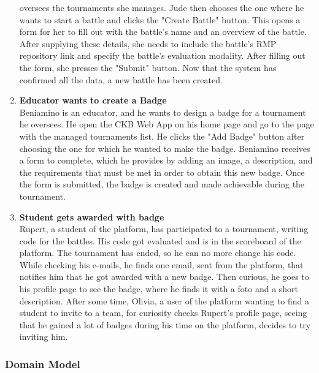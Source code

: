 \begin{enumerate}[label= \textbf{SC\arabic*}]
    oversees the tournaments she manages. Jude then chooses the one where he wants to start a battle and clicks the "Create Battle" button. This opens a form for her to fill out with the battle's name and an overview of the battle. 
    After supplying these details, she needs to include the battle's RMP repository link and specify the battle's evaluation modality. After filling out the form, she presses the "Submit" button. Now that the system has confirmed all 
    the data, a new battle has been created.
    \item \textbf{Educator wants to create a Badge} \label{sc:sc12} \\Beniamino is an educator, and he wants to design a badge for a tournament he oversees. He open the CKB Web App on his home page and go to the page with the managed tournaments list.
    He clicks the "Add Badge" button after choosing the one for which he wanted to make the badge. Beniamino receives a form to complete, which he provides by adding an image, a description, and the requirements that must be met in order 
    to obtain this new badge. Once the form is submitted, the badge is created and made achievable during the tournament.
    \item \textbf{Student gets awarded with badge} \label{sc:sc13} \\
    Rupert, a student of the platform, has participated to a tournament, writing code for the battles. His code got evaluated and is in the scoreboard of the platform. The tournament has ended, so he can no more change his code. 
    While checking his e-mails, he finds one email, sent from the platform, that notifies him that he got awarded with a new badge.
    Then curious, he goes to his profile page to see the badge, where he finds it with a foto and a short description.
    After some time, Olivia, a user of the platform wanting to find a student to invite to a team, for curiosity checks Rupert's profile page, seeing that he gained a lot of badges during his time on the platform, decides to try inviting him.
\end{enumerate}

\newpage

\subsubsection{Domain Model}

